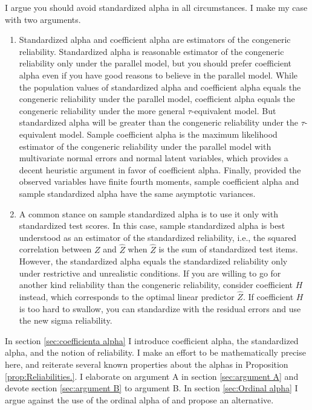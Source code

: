 \documentclass[twoside]{article}
\begin{document}
I argue you should avoid standardized alpha in all circumstances. I make my case with two arguments.

\begin{enumerate}[label=(\Alph*)]
\item Standardized alpha and coefficient alpha are estimators of the congeneric reliability. Standardized alpha is reasonable estimator of the congeneric reliability only under the parallel model, but you should prefer coefficient alpha even if you have good reasons to believe in the parallel model. While the population values of standardized alpha and coefficient alpha equals the congeneric reliability under the parallel model, coefficient alpha equals the congeneric reliability under the more general $\tau$-equivalent model. But standardized alpha will be greater than the congeneric reliability under the $\tau$-equivalent model. Sample coefficient alpha is the maximum likelihood estimator of the congeneric reliability under the parallel model with multivariate normal errors and normal latent variables, which provides a decent heuristic argument in favor of coefficient alpha. Finally, provided the observed variables have finite fourth moments, sample coefficient alpha and sample standardized alpha have the same asymptotic variances. 

\item A common stance on sample standardized alpha is to use it only with standardized test scores. In this case, sample standardized alpha is best understood as an estimator of the standardized reliability, i.e., the squared correlation between $Z$ and $\hat{Z}$ when $\hat{Z}$ is the sum of standardized test items. However, the standardized alpha equals the standardized reliability only under restrictive and unrealistic conditions. If you are willing to go for another kind reliability than the congeneric reliability, consider coefficient $H$ instead, which corresponds to the optimal linear predictor $\hat{Z}$. If coefficient $H$ is too hard to swallow, you can standardize with the residual errors and use the new sigma reliability.
\end{enumerate}

In section \ref{sec:coefficienta alpha} I introduce coefficient alpha, the standardized alpha, and the notion of reliability. I make an effort to be mathematically precise here, and reiterate several known properties about the alphas in Proposition \ref{prop:Reliabilities.}. I elaborate on argument A in section \ref{sec:argument A} and devote section \ref{sec:argument B} to argument B. In section \ref{sec:Ordinal alpha} I argue against the use of the ordinal alpha of  \citet{Zumbo2007-ap} and propose an alternative.
\end{document}
